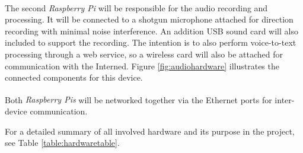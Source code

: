 \documentclass[11pt,a4paper,titlepage]{report}
\newcommand{\rpi}{\textit{Raspberry Pi\textsuperscript{\textregistered}}}
\newcommand{\rpis}{\textit{Raspberry Pi\textsuperscript{\textregistered}s}}
\begin{document}
The second \rpi\xspace will be responsible for the audio recording and processing. It will be connected to a shotgun microphone attached for direction recording with minimal noise interference. An addition USB sound card will also included to support the recording. The intention is to also perform voice-to-text processing through a web service, so a wireless card will also be attached for communication with the Interned. Figure \ref{fig:audiohardware} illustrates the connected components for this device.

Both \rpis\xspace will be networked together via the Ethernet ports for inter-device communication.

For a detailed summary of all involved hardware and its purpose in the project, see Table \ref{table:hardwaretable}. 


\end{document}
